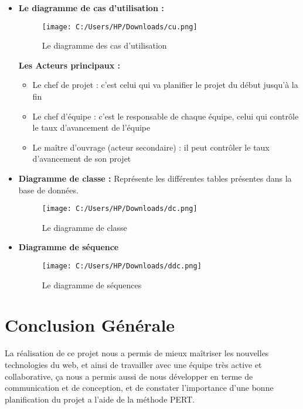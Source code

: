 \documentclass{report}
\begin{document}
\begin{itemize}

\newpage
\item \textbf{ Le diagramme de cas d’utilisation :}

\begin{figure}[!ht] 
    \center 
    \texttt{[image: C:/Users/HP/Downloads/cu.png]} 
    \caption{Le diagramme des cas d’utilisation }
\end{figure}

\vspace*{\fill}

\textbf{Les Acteurs principaux :}
\begin{itemize} 
\item Le chef de projet : c’est celui qui va planifier le projet du début jusqu’à la fin 
\item Le chef d’équipe : c’est le responsable de chaque équipe, celui qui contrôle le taux d’avancement de l’équipe  
\item Le maître d’ouvrage (acteur secondaire) : il peut contrôler le taux d’avancement de son projet 
\end{itemize}
\vspace*{\fill}
\newpage

\vspace*{\fill}

\item \textbf{Diagramme de classe : }
Représente les différentes tables présentes dans la base de données.

\begin{figure}[!ht] 
    \center 
    \texttt{[image: C:/Users/HP/Downloads/dc.png]} 
    \caption{Le diagramme de classe }
\end{figure}

\vspace*{\fill}

\newpage
\item \textbf{Diagramme de séquence }

\begin{figure}[!ht] 
    \center 
    \texttt{[image: C:/Users/HP/Downloads/ddc.png]} 
    \caption{Le diagramme de séquences }
\end{figure}

\end{itemize}


\vspace*{\fill}

\huge
\chapter*{Conclusion Générale}

La réalisation de ce projet nous a permis de mieux maîtriser les nouvelles technologies du web, et ainsi de travailler avec une équipe très active et collaborative, ça nous a permis aussi de nous développer en terme de communication et de conception, et de constater l’importance d’une bonne planification du projet a l’aide de la méthode PERT.

\vspace*{\fill}
\end{document}
